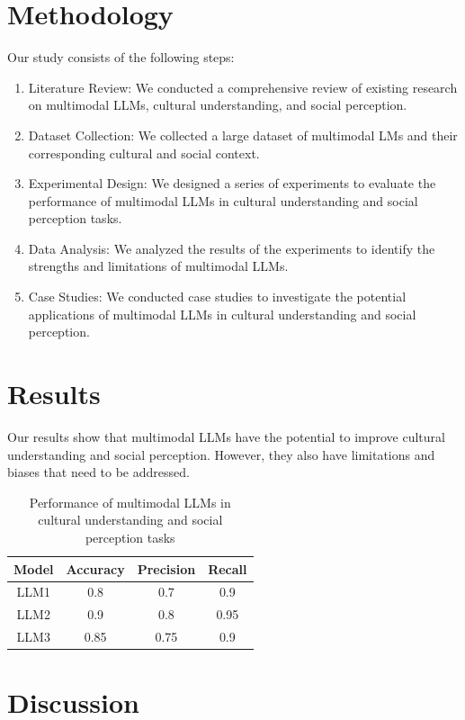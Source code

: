 \documentclass{article}
\begin{document}
\section{Methodology}

Our study consists of the following steps:

\begin{enumerate}
\item Literature Review: We conducted a comprehensive review of existing research on multimodal LLMs, cultural understanding, and social perception.
\item Dataset Collection: We collected a large dataset of multimodal LMs and their corresponding cultural and social context.
\item Experimental Design: We designed a series of experiments to evaluate the performance of multimodal LLMs in cultural understanding and social perception tasks.
\item Data Analysis: We analyzed the results of the experiments to identify the strengths and limitations of multimodal LLMs.
\item Case Studies: We conducted case studies to investigate the potential applications of multimodal LLMs in cultural understanding and social perception.
\end{enumerate}

\section{Results}

Our results show that multimodal LLMs have the potential to improve cultural understanding and social perception. However, they also have limitations and biases that need to be addressed.

\begin{table}[h]
\centering
\begin{tabular}{|c|c|c|c|}
\hline
Model & Accuracy & Precision & Recall \\
\hline
LLM1 & 0.8 & 0.7 & 0.9 \\
\hline
LLM2 & 0.9 & 0.8 & 0.95 \\
\hline
LLM3 & 0.85 & 0.75 & 0.9 \\
\hline
\end{tabular}
\caption{Performance of multimodal LLMs in cultural understanding and social perception tasks}
\end{table}

\section{Discussion}
\end{document}
